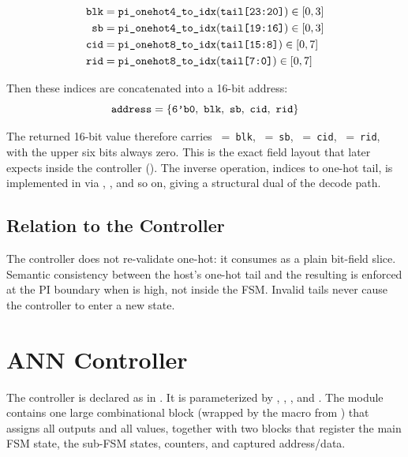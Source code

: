\begin{align*}
    \texttt{blk} &= \texttt{pi\_onehot4\_to\_idx}(\texttt{tail[23:20]}) \in [0,3] \\
    \texttt{sb}  &= \texttt{pi\_onehot4\_to\_idx}(\texttt{tail[19:16]}) \in [0,3] \\
    \texttt{cid} &= \texttt{pi\_onehot8\_to\_idx}(\texttt{tail[15:8]})  \in [0,7] \\
    \texttt{rid} &= \texttt{pi\_onehot8\_to\_idx}(\texttt{tail[7:0]})   \in [0,7]
\end{align*}

\noindent Then these indices are concatenated into a 16-bit address:
\[
    \texttt{address} = \{\texttt{6'b0},~\texttt{blk},~\texttt{sb},~\texttt{cid},~\texttt{rid}\}
\]

The returned 16-bit value therefore carries \sv{[9:8]}~=~\texttt{blk},
\sv{[7:6]}~=~\texttt{sb}, \sv{[5:3]}~=~\texttt{cid},
\sv{[2:0]}~=~\texttt{rid}, with the upper six bits always zero. This is
the exact field layout that  later expects inside
the controller (). The inverse operation,
indices to one-hot tail, is implemented in 
via , , and so on, giving a structural
dual of the decode path.

\subsection{Relation to the Controller}
\label{sec:rtl-pi-controller}

The controller does not re-validate one-hot: it consumes 
as a plain bit-field slice. Semantic consistency between the host's
one-hot tail and the resulting  is enforced at the PI
boundary when  is high, not inside the FSM. Invalid tails
never cause the controller to enter a new state.

\section{ANN Controller}
\label{sec:rtl-controller}

The controller is declared as  in
. It is parameterized by
, , , and
. The module contains one large combinational
block (wrapped by the  macro from
) that assigns all outputs and all
 values, together with two  blocks that
register the main FSM state, the sub-FSM states, counters, and captured
address/data.

